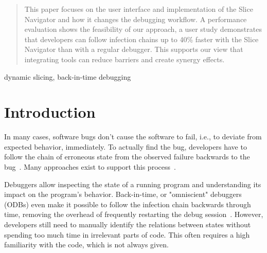 \documentclass[
			english,
			review,
			]{elsarticle}
\begin{document}
\begin{frontmatter}
\begin{abstract}
This paper focuses on the user interface and implementation of the Slice Navigator and how it changes the debugging workflow. 
A performance evaluation shows the feasibility of our approach, a user study demonstrates that developers can follow infection chains up to 40\% faster with the Slice Navigator than with a regular debugger. 
This supports our view that integrating tools can reduce barriers and create synergy effects.

\end{abstract}

\begin{keyword}
dynamic slicing, back-in-time debugging
\end{keyword}

\end{frontmatter}

\linenumbers

\section{Introduction}
\label{sec:introduction}

In many cases, software bugs don't cause the software to fail, i.e., to deviate from expected behavior, immediately.
To actually find the bug, developers have to follow the chain of erroneous state from the observed failure backwards to the bug~\cite{zeller_why_2009}.
Many approaches exist to support this process~\cite{wong_survey_2016}.

Debuggers allow inspecting the state of a running program and understanding its impact on the program's behavior.
Back-in-time, or "omniscient" debuggers (ODBs) even make it possible to follow the infection chain backwards through time, removing the overhead of frequently restarting the debug session~\cite{lewis_debugging_2003}.
However, developers still need to manually identify the relations between states without spending too much time in irrelevant parts of code.
This often requires a high familiarity with the code, which is not always given.
%
\end{document}
